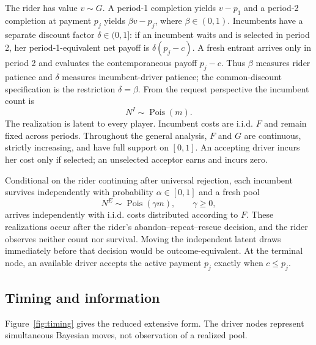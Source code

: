 \documentclass[mnsc,blindrev]{informs3}
\begin{document}
The rider has value $v\sim G$.  A period-1 completion yields $v-p_1$ and a
period-2 completion at payment $p_j$ yields $\beta v-p_j$, where
$\beta\in(0,1)$.  Incumbents have a separate discount factor
$\delta\in(0,1]$: if an incumbent waits and is selected in period 2, her
period-1-equivalent net payoff is $\delta(p_j-c)$.  A fresh entrant arrives
only in period 2 and evaluates the contemporaneous payoff $p_j-c$.  Thus
$\beta$ measures rider patience and $\delta$ measures incumbent-driver
patience; the common-discount specification is the restriction
$\delta=\beta$.  From the request perspective the incumbent count is
\[
 N^I\sim\operatorname{Pois}(m).
\]
The realization is latent to every player.  Incumbent costs are i.i.d.
$F$ and remain fixed across periods.  Throughout the general analysis, $F$
and $G$ are continuous, strictly increasing, and have full support on
$[0,1]$.  An accepting driver incurs her cost
only if selected; an unselected acceptor earns and incurs zero.

Conditional on the rider continuing after universal rejection, each
incumbent survives independently with probability $\alpha\in[0,1]$ and a
fresh pool
\[
N^E\sim\operatorname{Pois}(\gamma m),\qquad \gamma\ge0,
\]
arrives independently with i.i.d. costs distributed according to $F$.  These realizations occur
after the rider's abandon--repeat--rescue decision, and the rider observes
neither count nor survival.  Moving the independent latent draws immediately
before that decision would be outcome-equivalent.  At the terminal node, an
available driver accepts the active payment $p_j$ exactly when $c\le p_j$.

\subsection{Timing and information}

Figure~\ref{fig:timing} gives the reduced extensive form.  The driver nodes
represent simultaneous Bayesian moves, not observation of a realized pool.
\end{document}
